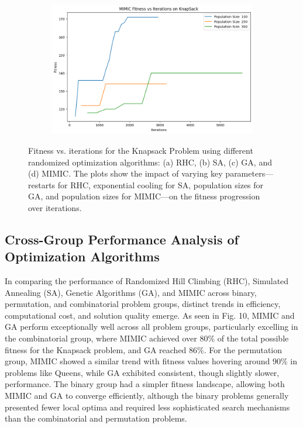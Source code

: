 \begin{figure}[htbp]
\begin{subfigure}[b]{0.49\textwidth}
        \caption{}
        \label{fig:knapsackga}
    \end{subfigure}
    \hfill
    \begin{subfigure}[b]{0.49\textwidth}
        \centering
        \includegraphics[width=\textwidth]{image/knapsack/mimic.png}
        \caption{}
        \label{fig:knapsackmimic}
    \end{subfigure}
    \caption{Fitness vs. iterations for the Knapsack Problem using different randomized optimization algorithms: (a) RHC, (b) SA, (c) GA, and (d) MIMIC. The plots show the impact of varying key parameters—restarts for RHC, exponential cooling for SA, population sizes for GA, and population sizes for MIMIC—on the fitness progression over iterations.}
    \label{fig:knapsackgrid}
\end{figure}

\subsection{Cross-Group Performance Analysis of Optimization Algorithms}
In comparing the performance of Randomized Hill Climbing (RHC), Simulated Annealing (SA), Genetic Algorithms (GA), and MIMIC across binary, permutation, and combinatorial problem groups, distinct trends in efficiency, computational cost, and solution quality emerge. As seen in Fig. 10, MIMIC and GA perform exceptionally well across all problem groups, particularly excelling in the combinatorial group, where MIMIC achieved over 80\% of the total possible fitness for the Knapsack problem, and GA reached 86\%. For the permutation group, MIMIC showed a similar trend with fitness values hovering around 90\% in problems like Queens, while GA exhibited consistent, though slightly slower, performance. The binary group had a simpler fitness landscape, allowing both MIMIC and GA to converge efficiently, although the binary problems generally presented fewer local optima and required less sophisticated search mechanisms than the combinatorial and permutation problems.

